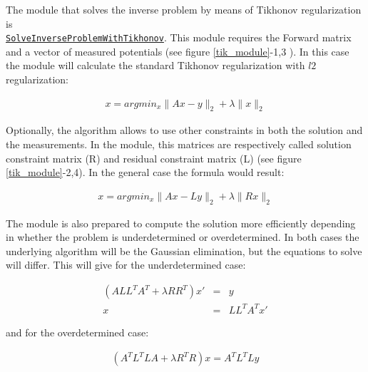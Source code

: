 The module that solves the inverse problem by means of Tikhonov regularization is\\
\href{http://scirundocwiki.sci.utah.edu/SCIRunDocs/index.php/CIBC:Documentation:SCIRun:Reference:BioPSE:SolveInverseProblemWithTikhonov}{{\tt SolveInverseProblemWithTikhonov}}.
This module requires the Forward matrix and a vector of measured potentials (see figure \ref{tik_module}-1,3 ). In this case the module will calculate the standard Tikhonov regularization with $l2$ regularization:
\begin{center}
 \begin{eqnarray}
  x = argmin_x \|Ax -y\|_2 + \lambda \|x\|_2
 \end{eqnarray}
\end{center}

Optionally, the algorithm allows to use other constraints in both the solution and the measurements. In the module, this matrices are respectively called solution constraint 
matrix (R) and residual constraint matrix (L) (see figure \ref{tik_module}-2,4). In the general case the formula would result:
\begin{center}
 \begin{eqnarray}
  x = argmin_x \|Ax -Ly\|_2 + \lambda \|Rx\|_2
 \end{eqnarray}
\end{center}

The module is also prepared to compute the solution more efficiently depending in whether the problem is underdetermined or overdetermined. In both cases the underlying 
algorithm will be the Gaussian elimination, but the equations to solve will differ. This will give for the underdetermined case:
\begin{center}
 \begin{eqnarray}
  (ALL^TA^T + \lambda RR^T)x' &=& y\\
  x &=& LL^TA^Tx'
  \label{tik_problem_underdet_invop}
 \end{eqnarray}
\end{center}
\noindent and for the overdetermined case:
\begin{center}
 \begin{eqnarray}
  (A^TL^TLA + \lambda R^TR)x = A^TL^TLy 
  \label{tik_problem_overdet_invop}
 \end{eqnarray}
\end{center}

